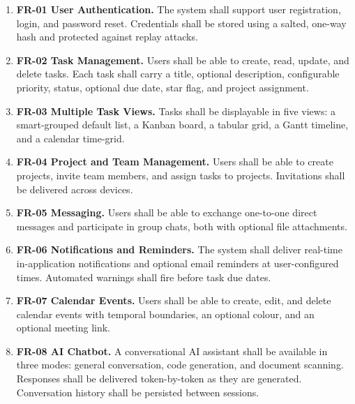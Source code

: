\begin{enumerate}
    \item \textbf{FR-01 User Authentication.}
          The system shall support user registration, login, and password reset.
          Credentials shall be stored using a salted, one-way hash and protected
          against replay attacks.

    \item \textbf{FR-02 Task Management.}
          Users shall be able to create, read, update, and delete tasks.
          Each task shall carry a title, optional description, configurable priority,
          status, optional due date, star flag, and project assignment.

    \item \textbf{FR-03 Multiple Task Views.}
          Tasks shall be displayable in five views: a smart-grouped default list, a
          Kanban board, a tabular grid, a Gantt timeline, and a calendar time-grid.

    \item \textbf{FR-04 Project and Team Management.}
          Users shall be able to create projects, invite team members, and assign tasks
          to projects. Invitations shall be delivered across devices.

    \item \textbf{FR-05 Messaging.}
          Users shall be able to exchange one-to-one direct messages and participate in
          group chats, both with optional file attachments.

    \item \textbf{FR-06 Notifications and Reminders.}
          The system shall deliver real-time in-application notifications and optional
          email reminders at user-configured times.
          Automated warnings shall fire before task due dates.

    \item \textbf{FR-07 Calendar Events.}
          Users shall be able to create, edit, and delete calendar events with temporal
          boundaries, an optional colour, and an optional meeting link.

    \item \textbf{FR-08 AI Chatbot.}
          A conversational AI assistant shall be available in three modes: general
          conversation, code generation, and document scanning.
          Responses shall be delivered token-by-token as they are generated.
          Conversation history shall be persisted between sessions.


\end{enumerate}
